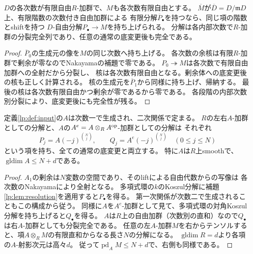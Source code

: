 \begin{lemma}[次数別分裂する自由分解の持上げ]\label{lp:lem:resolution}
$D$の各次数が有限自由$R$-加群で、$M$も各次数有限自由とする。
$\overline M$が$\overline D=D/\mathfrak mD$上、有限階数の次数付き自由加群による
有限分解$\overline P_\bullet$を持つなら、同じ項の階数とshiftを持つ
$D$-自由分解$P_\bullet\to M$を持ち上げられる。
分解は各内部次数で$R$-加群の分裂完全列であり、任意の通常の底変更後も完全である。
\end{lemma}
\begin{proof}
$\overline P_0$の生成元の像を$M$の同じ次数へ持ち上げる。
各次数の余核は有限$R$-加群で剰余が零なのでNakayamaの補題で零である。
$P_0\twoheadrightarrow M$は各次数で有限自由加群への全射だから分裂し、
核は各次数有限自由となる。剰余体への底変更後の核も正しく計算される。
核の生成元を$\overline P_1$から同様に持ち上げ、帰納する。
最後の核は各次数有限自由かつ剰余が零であるから零である。
各段階の内部次数別分裂により、底変更後にも完全性が残る。
\end{proof}

\begin{proposition}[全次数の相対Koszul性とambientの対角]\label{lp:prop:koszul}
定義\ref{lp:def:input}の$A$は次数一で生成され、二次関係で定まる。
$R$の左右$A$-加群としての分解と、$A$の$A^e=A\otimes_RA^{\rm op}$-加群としての分解は
それぞれ
\[
 P_j=A(-j)^{\binom Nj},\qquad
 Q_j=A^e(-j)^{\binom Nj}\quad(0\le j\le N)
 \tag{K}\label{lp:eq:koszul}
\]
という項を持ち、全ての通常の底変更と両立する。
特に$A$は$R$上smoothで、$\operatorname{gldim}A\le N+d$である。
\end{proposition}
\begin{proof}
$A_1$の剰余は$N$変数の空間であり、そのliftによる自由代数からの写像は
各次数のNakayamaにより全射となる。
多項式環の$k$のKoszul分解に補題\ref{lp:lem:resolution}を適用すると$P_\bullet$を得る。
第一次関係が次数二で生成されることもこの構成から従う。
同様に$A$を$A^e$-加群として見て、多項式環の対角Koszul分解を持ち上げると$Q_\bullet$を得る。
$A$は$R$上の自由加群（次数別の直和）なので$Q_\bullet$は右$A$-加群としても分裂完全である。
任意の左$A$-加群$M$を右からテンソルすると、項$A\otimes_R M$の有限直和からなる長さ$N$の分解になる。
$\operatorname{gldim}R=d$より各項の$A$-射影次元は高々$d$。
従って$\operatorname{pd}_A M\le N+d$で、右側も同様である。
\end{proof}

